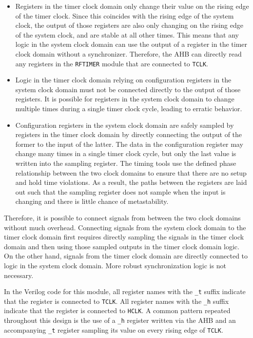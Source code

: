 \begin{itemize}
	\item Registers in the timer clock domain only change their value on the rising edge of the timer clock. Since this coincides with the rising edge of the system clock, the output of those registers are also only changing on the rising edge of the system clock, and are stable at all other times. This means that any logic in the system clock domain can use the output of a register in the timer clock domain without a synchronizer. Therefore, the AHB can directly read any registers in the \texttt{RFTIMER} module that are connected to \texttt{TCLK}.
	\item Logic in the timer clock domain relying on configuration registers in the system clock domain must not be connected directly to the output of those registers. It is possible for registers in the system clock domain to change multiple times during a single timer clock cycle, leading to erratic behavior.
	\item Configuration registers in the system clock domain are safely sampled by registers in the timer clock domain by directly connecting the output of the former to the input of the latter. The data in the configuration register may change many times in a single timer clock cycle, but only the last value is written into the sampling register. The timing tools use the defined phase relationship between the two clock domains to ensure that there are no setup and hold time violations. As a result, the paths between the registers are laid out such that the sampling register does not sample when the input is changing and there is little chance of metastability.
\end{itemize}

Therefore, it is possible to connect signals from between the two clock domains without much overhead. Connecting signals from the system clock domain to the timer clock domain first requires directly sampling the signals in the timer clock domain and then using those sampled outputs in the timer clock domain logic. On the other hand, signals from the timer clock domain are directly connected to logic in the system clock domain. More robust synchronization logic is not necessary.

In the Verilog code for this module, all register names with the \texttt{\_t} suffix indicate that the register is connected to \texttt{TCLK}. All register names with the \texttt{\_h} suffix indicate that the register is connected to \texttt{HCLK}. A common pattern repeated throughout this design is the use of a \texttt{\_h} register written via the AHB and an accompanying \texttt{\_t} register sampling its value on every rising edge of \texttt{TCLK}.

